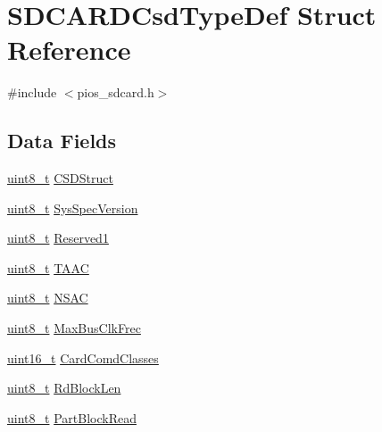 \hypertarget{struct_s_d_c_a_r_d_csd_type_def}{\section{S\-D\-C\-A\-R\-D\-Csd\-Type\-Def Struct Reference}
\label{struct_s_d_c_a_r_d_csd_type_def}
}


{\ttfamily \#include $<$pios\-\_\-sdcard.\-h$>$}

\subsection*{Data Fields}
\begin{DoxyCompactItemize}
\item 
\hyperlink{stdint_8h_aba7bc1797add20fe3efdf37ced1182c5}{uint8\-\_\-t} \hyperlink{group___p_i_o_s___s_d_c_a_r_d_ga49354de313b96595043a78940055d651}{C\-S\-D\-Struct}
\item 
\hyperlink{stdint_8h_aba7bc1797add20fe3efdf37ced1182c5}{uint8\-\_\-t} \hyperlink{group___p_i_o_s___s_d_c_a_r_d_ga68ba16a5f115dc00b88d70d6912a1c45}{Sys\-Spec\-Version}
\item 
\hyperlink{stdint_8h_aba7bc1797add20fe3efdf37ced1182c5}{uint8\-\_\-t} \hyperlink{group___p_i_o_s___s_d_c_a_r_d_ga8d15c8c3b9e293b1b62efea47010180d}{Reserved1}
\item 
\hyperlink{stdint_8h_aba7bc1797add20fe3efdf37ced1182c5}{uint8\-\_\-t} \hyperlink{group___p_i_o_s___s_d_c_a_r_d_gaec29af38b2fc16f147533e11c61e2787}{T\-A\-A\-C}
\item 
\hyperlink{stdint_8h_aba7bc1797add20fe3efdf37ced1182c5}{uint8\-\_\-t} \hyperlink{group___p_i_o_s___s_d_c_a_r_d_ga8573c74ea99da2cfb8f4848fa4350491}{N\-S\-A\-C}
\item 
\hyperlink{stdint_8h_aba7bc1797add20fe3efdf37ced1182c5}{uint8\-\_\-t} \hyperlink{group___p_i_o_s___s_d_c_a_r_d_ga9413a0371dfa0c4bf305c922b10392f1}{Max\-Bus\-Clk\-Frec}
\item 
\hyperlink{stdint_8h_a273cf69d639a59973b6019625df33e30}{uint16\-\_\-t} \hyperlink{group___p_i_o_s___s_d_c_a_r_d_ga6684006d87c1e8fda9008685fd83698b}{Card\-Comd\-Classes}
\item 
\hyperlink{stdint_8h_aba7bc1797add20fe3efdf37ced1182c5}{uint8\-\_\-t} \hyperlink{group___p_i_o_s___s_d_c_a_r_d_gab4a98c4b27e0e4cbb4ace4d6ff93c056}{Rd\-Block\-Len}
\item 
\hyperlink{stdint_8h_aba7bc1797add20fe3efdf37ced1182c5}{uint8\-\_\-t} \hyperlink{group___p_i_o_s___s_d_c_a_r_d_gab165bf6b064166e0bf54f2a6c7d85a9a}{Part\-Block\-Read}

\end{DoxyCompactItemize}
